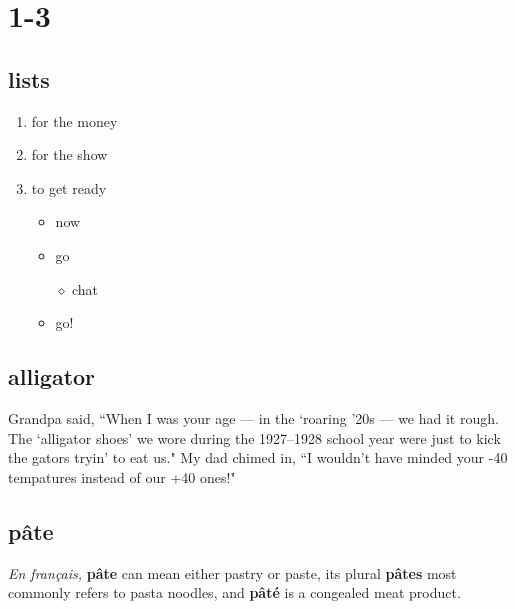 \documentclass{article}
\begin{document}
\section{1-3}

\subsection{lists}

\begin{enumerate}
    \item for the money
    \item for the show
    \item to get ready
    \begin{itemize}
        \item now
        \item go
        \item[$\diamond$] chat 
        \item go!
    \end{itemize}
\end{enumerate}

\subsection{alligator}

Grandpa said, ``When I was your age --- in the `roaring '20s --- we had it rough. The `alligator 
shoes' we wore during the 1927--1928 school year were just to kick the gators tryin' to eat us."
 My dad chimed in, ``I wouldn't have minded your -40 tempatures instead of our +40 ones!"

\subsection{p\^ate}

\emph{En fran\c{c}ais,} \textbf{p\^ate} can mean either pastry or paste, its plural \textbf{p\^ates}
most commonly refers to pasta noodles, and \textbf{p\^at\'e} is a congealed meat product.
\end{document}

